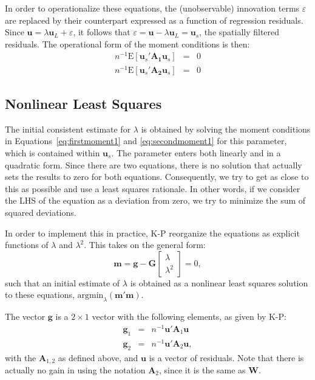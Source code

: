 \documentclass{article}
\begin{document}
In order to operationalize these equations, the (unobservable) innovation terms
$\varepsilon$ are replaced by their counterpart expressed as a function of regression
residuals. Since $\mathbf{u} = \lambda \mathbf{u}_L + \varepsilon$, it follows that
$\varepsilon = \mathbf{u} - \lambda \mathbf{u}_L = \mathbf{u}_s$, the spatially
filtered residuals. The operational form of the moment conditions is
then:
\begin{eqnarray}
n^{-1} \mbox{E} [ \mathbf{u}_s ' \mathbf{A_1} \mathbf{u}_s ] &=& 0 \label{eq:firstmoment1}\\
n^{-1} \mbox{E} [ \mathbf{u}_s ' \mathbf{A_2} \mathbf{u}_s ] &=& 0 \label{eq:secondmoment1}
\end{eqnarray}

\subsection{Nonlinear Least Squares}\label{ss:nonlinearls}
The initial consistent estimate for $\lambda$ is obtained by solving the moment
conditions in Equations~\ref{eq:firstmoment1} and \ref{eq:secondmoment1} for this parameter, which is contained within $\mathbf{u}_s$. The parameter
enters both linearly and in a quadratic form. Since there are two equations,
there is no solution that actually sets the results to zero for both equations.
Consequently, we try to get as close to this as possible and use a least squares
rationale. In other words, if we consider the LHS of the equation as a deviation
from zero, we try to minimize the sum of squared deviations.

In order to implement this in practice, K-P reorganize the equations as 
explicit functions of $\lambda$ and $\lambda^2$. This takes on the general form:
\begin{equation*}
\mathbf{m} = \mathbf{g} - \mathbf{G}
\left[
\begin{matrix}
\lambda\\
\lambda^2
\end{matrix}
\right] = 0,
\end{equation*}
such that an initial estimate of $\lambda$ is obtained as a nonlinear least
squares solution to these equations, $\mbox{argmin}_\lambda (\mathbf{m'm})$.

The vector $\mathbf{g}$ is a $2 \times 1$ vector with the following elements,
as given by K-P:
\begin{eqnarray*}
 \mathbf{g}_1 &=& n^{-1} \mathbf{u}' \mathbf{A}_1 \mathbf{u}\\
  \mathbf{g}_2 &=& n^{-1} \mathbf{u}' \mathbf{A}_2 \mathbf{u},
\end{eqnarray*}
with the $\mathbf{A}_{1,2}$ as defined above, and $\mathbf{u}$ is a vector
of residuals. Note that there is actually no gain in using the notation $\mathbf{A}_2$,
since it is the same as $\mathbf{W}$.
\end{document}
